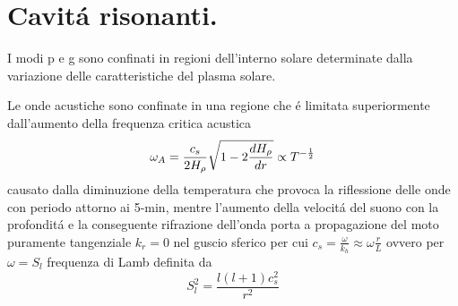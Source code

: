 \documentclass[../main.tex]{subfiles}
\begin{document}
\section{Cavit\'a risonanti.} \label{sec:resonantcavity} %

I modi p e g sono confinati in regioni dell'interno solare determinate dalla variazione delle caratteristiche del plasma solare.

\begin{minipage}{\linewidth}
\end{minipage}

Le onde acustiche sono confinate in una regione che \'e limitata superiormente dall'aumento della frequenza critica acustica
\begin{equation}
\omega_A=\frac{c_s}{2H_{\rho}{}}\sqrt{1-2\frac{d H_{\rho}{}}{d r}}\propto T^{-\frac{1}{2}}\label{eq:acusticcutoff}
\end{equation}
causato dalla diminuzione della temperatura che provoca la riflessione delle onde con periodo attorno ai 5-min, mentre l'aumento della velocit\'a del suono con la profondit\'a e la conseguente rifrazione dell'onda porta a propagazione del moto puramente tangenziale $k_r=0$ nel guscio sferico per cui $c_s=\frac{\omega}{k_h}\approx\omega \frac{r}{L}$ ovvero per $\omega=S_l$ frequenza di Lamb definita da
\begin{equation}
S_l^2=\frac{l(l+1)c_s^2}{r^2}\label{eq:Lambf}
\end{equation}
\end{document}
